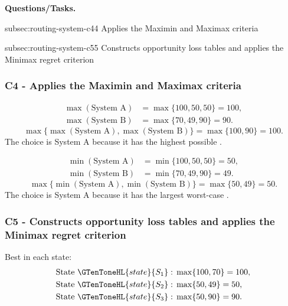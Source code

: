 	\textbf{Questions/Tasks.}
	\begin{enumerate}
		\CriterionTask
		{subsec:routing-system-c4}{4}
		{Applies the Maximin and Maximax criteria}

		\CriterionTask
		{subsec:routing-system-c5}{5}
		{Constructs opportunity loss tables and applies the Minimax regret criterion}
	\end{enumerate}
	
	\subsubsection*{C4 - Applies the Maximin and Maximax criteria}
	\label{subsec:routing-system-c4}
	
	\[
	\begin{aligned}
		\max(\text{System A}) &= \max\{100,50,50\}=100,\\
		\max(\text{System B}) &= \max\{70,49,90\}=90.
	\end{aligned}
	\]
	\[
	\max\{\max(\text{System A}),\max(\text{System B})\}
	=\max\{100,90\}
	=100.
	\]
	The  choice is System A because it has the highest possible .
	
	\[
	\begin{aligned}
		\min(\text{System A}) &= \min\{100,50,50\}=50,\\
		\min(\text{System B}) &= \min\{70,49,90\}=49.
	\end{aligned}
	\]
	\[
	\max\{\min(\text{System A}),\min(\text{System B})\}
	=\max\{50,49\}
	=50.
	\]
	The  choice is System A because it has the largest worst-case .
	
	\subsubsection*{C5 - Constructs opportunity loss tables and applies the Minimax regret criterion}
	\label{subsec:routing-system-c5}
	
	Best  in each state:
	\[
	\begin{aligned}
		\text{State }\GTenToneHL{state}{S_1}:\;&\max\{100,70\}=100,\\
		\text{State }\GTenToneHL{state}{S_2}:\;&\max\{50,49\}=50,\\
		\text{State }\GTenToneHL{state}{S_3}:\;&\max\{50,90\}=90.
	\end{aligned}
	\]
	
